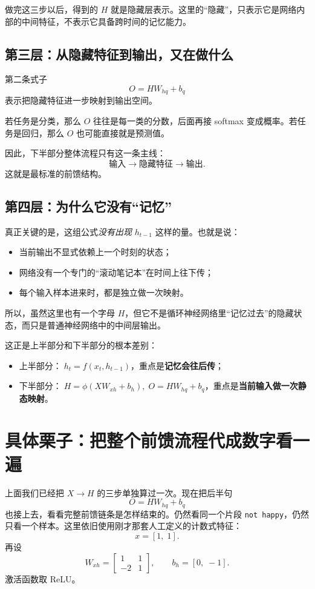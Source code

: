 \documentclass[12pt,a4paper]{ctexart}
\begin{document}
做完这三步以后，得到的 \(H\) 就是隐藏层表示。这里的“隐藏”，只表示它是网络内部的中间特征，不表示它具备跨时间的记忆能力。

\subsection{第三层：从隐藏特征到输出，又在做什么}

第二条式子
\[
O = HW_{hq} + b_q
\]
表示把隐藏特征进一步映射到输出空间。

若任务是分类，那么 \(O\) 往往是每一类的分数，后面再接 softmax 变成概率。若任务是回归，那么 \(O\) 也可能直接就是预测值。

因此，下半部分整体流程只有这一条主线：
\[
\text{输入} \longrightarrow \text{隐藏特征} \longrightarrow \text{输出}.
\]
这就是最标准的前馈结构。

\subsection{第四层：为什么它没有“记忆”}

真正关键的是，这组公式\emph{没有出现} \(h_{t-1}\) 这样的量。也就是说：
\begin{itemize}
  \item 当前输出不显式依赖上一个时刻的状态；
  \item 网络没有一个专门的“滚动笔记本”在时间上往下传；
  \item 每个输入样本进来时，都是独立做一次映射。
\end{itemize}

所以，虽然这里也有一个字母 \(H\)，但它不是循环神经网络里“记忆过去”的隐藏状态，而只是普通神经网络中的中间层输出。

这正是上半部分和下半部分的根本差别：
\begin{itemize}
  \item 上半部分：\(\;h_t = f(x_t, h_{t-1})\)，重点是\textbf{记忆会往后传}；
  \item 下半部分：\(\;H = \phi(XW_{xh}+b_h),\; O = HW_{hq}+b_q\)，重点是\textbf{当前输入做一次静态映射}。
\end{itemize}

\section{具体栗子：把整个前馈流程代成数字看一遍}

上面我们已经把 \(X \to H\) 的三步单独算过一次。现在把后半句
\[
O = HW_{hq} + b_q
\]
也接上去，看看完整前馈链条是怎样结束的。仍然看同一个片段 \texttt{not happy}，仍然只看一个样本。这里依旧使用刚才那套人工定义的计数式特征：
\[
x = [1,\;1].
\]
再设
\[
W_{xh} =
\begin{bmatrix}
1 & 1\\
-2 & 1
\end{bmatrix},
\qquad
b_h = [0,\;-1].
\]
激活函数取 ReLU。
\end{document}
